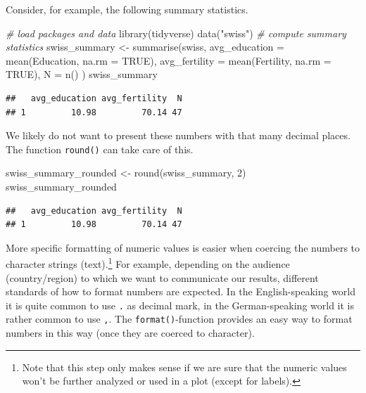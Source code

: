 \documentclass[
  12pt,
]{style/krantz}
\newenvironment{Shaded}{\begin{snugshade}}{\end{snugshade}}
\newcommand{\AttributeTok}[1]{\textcolor[rgb]{0.77,0.63,0.00}{#1}}
\newcommand{\CommentTok}[1]{\textcolor[rgb]{0.56,0.35,0.01}{\textit{#1}}}
\newcommand{\ConstantTok}[1]{\textcolor[rgb]{0.00,0.00,0.00}{#1}}
\newcommand{\DecValTok}[1]{\textcolor[rgb]{0.00,0.00,0.81}{#1}}
\newcommand{\FunctionTok}[1]{\textcolor[rgb]{0.00,0.00,0.00}{#1}}
\newcommand{\NormalTok}[1]{#1}
\newcommand{\OtherTok}[1]{\textcolor[rgb]{0.56,0.35,0.01}{#1}}
\newcommand{\StringTok}[1]{\textcolor[rgb]{0.31,0.60,0.02}{#1}}
\begin{document}
Consider, for example, the following summary statistics.

\begin{Shaded}
\begin{Highlighting}[]
\CommentTok{\# load packages and data}
\FunctionTok{library}\NormalTok{(tidyverse)}
\FunctionTok{data}\NormalTok{(}\StringTok{"swiss"}\NormalTok{)}
\CommentTok{\# compute summary statistics}
\NormalTok{swiss\_summary }\OtherTok{\textless{}{-}}
  \FunctionTok{summarise}\NormalTok{(swiss,}
          \AttributeTok{avg\_education =} \FunctionTok{mean}\NormalTok{(Education, }\AttributeTok{na.rm =} \ConstantTok{TRUE}\NormalTok{),}
          \AttributeTok{avg\_fertility =} \FunctionTok{mean}\NormalTok{(Fertility, }\AttributeTok{na.rm =} \ConstantTok{TRUE}\NormalTok{),}
          \AttributeTok{N =} \FunctionTok{n}\NormalTok{()}
\NormalTok{          )}
\NormalTok{swiss\_summary}
\end{Highlighting}
\end{Shaded}

\begin{verbatim}
##   avg_education avg_fertility  N
## 1         10.98         70.14 47
\end{verbatim}

We likely do not want to present these numbers with that many decimal places. The function \texttt{round()} can take care of this.

\begin{Shaded}
\begin{Highlighting}[]
\NormalTok{swiss\_summary\_rounded }\OtherTok{\textless{}{-}} \FunctionTok{round}\NormalTok{(swiss\_summary, }\DecValTok{2}\NormalTok{)}
\NormalTok{swiss\_summary\_rounded}
\end{Highlighting}
\end{Shaded}

\begin{verbatim}
##   avg_education avg_fertility  N
## 1         10.98         70.14 47
\end{verbatim}

More specific formatting of numeric values is easier when coercing the numbers to character strings (text).\footnote{Note that this step only makes sense if we are sure that the numeric values won't be further analyzed or used in a plot (except for labels).} For example, depending on the audience (country/region) to which we want to communicate our results, different standards of how to format numbers are expected. In the English-speaking world it is quite common to use \texttt{.} as decimal mark, in the German-speaking world it is rather common to use \texttt{,}. The \texttt{format()}-function provides an easy way to format numbers in this way (once they are coerced to character).
\end{document}
